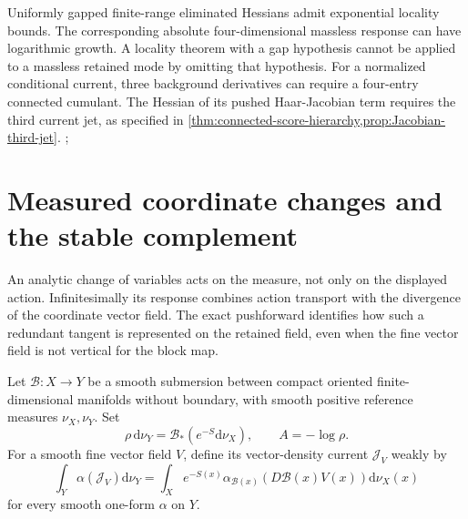 \documentclass[11pt,oneside,openany]{book}
\theoremstyle{definition}
\theoremstyle{remark}
\newcommand{\dd}{\mathrm d}
\newcommand{\src}[2]{\cite[#2]{#1}}
\begin{document}
Uniformly gapped finite-range eliminated Hessians admit exponential locality bounds. The corresponding absolute four-dimensional massless response can have logarithmic growth. A locality theorem with a gap hypothesis cannot be applied to a massless retained mode by omitting that hypothesis. For a normalized conditional current, three background derivatives can require a four-entry connected cumulant. The Hessian of its pushed Haar-Jacobian term requires the third current jet, as specified in \cref{thm:connected-score-hierarchy,prop:Jacobian-third-jet}. \src{F7}{V95--V100}; \src{F8}{V60--V61}

\section{Measured coordinate changes and the stable complement}
\label{sec:measured-redundancy}
An analytic change of variables acts on the measure, not only on the
displayed action. Infinitesimally its response combines action transport
with the divergence of the coordinate vector field. The exact
pushforward identifies how such a redundant tangent is represented on
the retained field, even when the fine vector field is not vertical for
the block map.

Let $\mathcal B:X\to Y$ be a smooth submersion between compact oriented
finite-dimensional manifolds without boundary, with smooth positive
reference measures $\nu_X,\nu_Y$. Set
\[
\rho\,\dd\nu_Y=\mathcal B_*(e^{-S}\dd\nu_X),
\qquad A=-\log\rho.
\]
For a smooth fine vector field $V$, define its vector-density current
$\mathcal J_V$ weakly by
\begin{equation}\label{eq:pushed-vector-current}
\int_Y\alpha(\mathcal J_V)\dd\nu_Y
=\int_Xe^{-S(x)}\alpha_{\mathcal B(x)}
       (D\mathcal B(x)V(x))\dd\nu_X(x)
\end{equation}
for every smooth one-form $\alpha$ on $Y$.
\end{document}

